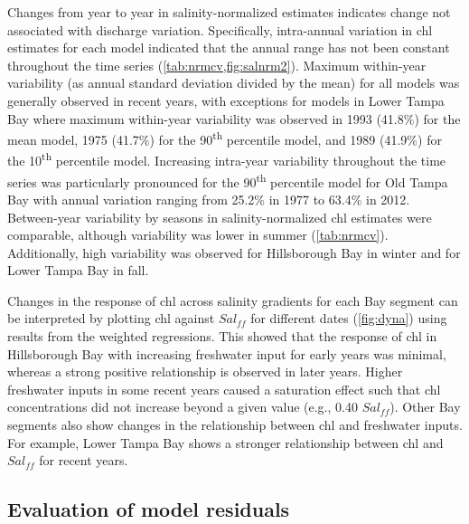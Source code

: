 \documentclass{svjour3}\usepackage[]{graphicx}\usepackage[]{color}
\newcommand{\nine}{90\textsuperscript{th} percentile }
\newcommand{\ten}{10\textsuperscript{th} percentile }
\begin{document}
Changes from year to year in salinity-normalized estimates indicates change not associated with discharge variation.  Specifically, intra-annual variation in \ac{chl} estimates for each model indicated that the annual range has not been constant throughout the time series (\cref{tab:nrmcv,fig:salnrm2}).  Maximum within-year variability (as annual standard deviation divided by the mean) for all models was generally observed in recent years, with exceptions for models in Lower Tampa Bay where maximum within-year variability was observed in 1993 (41.8\%) for the mean model, 1975 (41.7\%) for the \nine model, and 1989 (41.9\%) for the \ten model.  Increasing intra-year variability throughout the time series was particularly pronounced for the \nine model for Old Tampa Bay with annual variation ranging from 25.2\% in 1977  to 63.4\% in 2012.  Between-year variability by seasons in salinity-normalized \ac{chl} estimates were comparable, although variability was lower in summer (\cref{tab:nrmcv}).  Additionally, high variability was observed for Hillsborough Bay in winter and for Lower Tampa Bay in fall.

Changes in the response of \ac{chl} across salinity gradients for each Bay segment can be interpreted by plotting \ac{chl} against $Sal_{ff}$ for different dates (\cref{fig:dyna}) using results from the weighted regressions.  This showed that the response of \ac{chl} in Hillsborough Bay with increasing freshwater input for early years was minimal, whereas a strong positive relationship is observed in later years.  Higher freshwater inputs in some recent years caused a saturation effect such that \ac{chl} concentrations did not increase beyond a given value (e.g., 0.40 $Sal_{ff}$).  Other Bay segments also show changes in the relationship between \ac{chl} and freshwater inputs.  For example, Lower Tampa Bay shows a stronger relationship between \ac{chl} and $Sal_{ff}$ for recent years. 

\subsection{Evaluation of model residuals}
\end{document}
